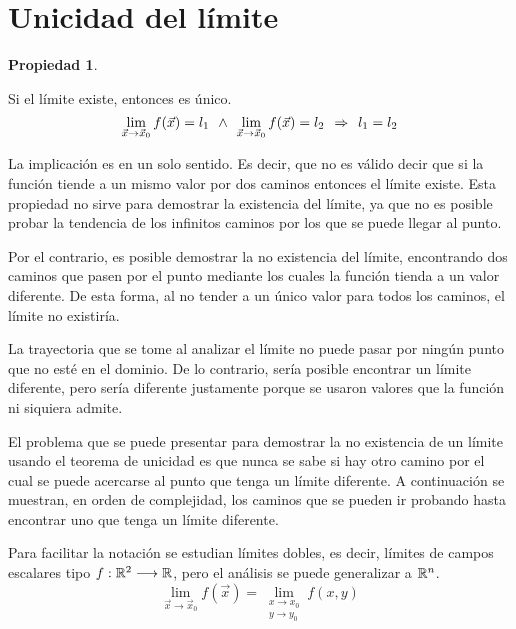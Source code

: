 \documentclass[a5paper,12pt,twoside]{book}
\newtheorem{prop}{{Propiedad}}[chapter]
\begin{document}
\section{Unicidad del límite}

\begin{mdframed}[style=MyFrame1]
    \begin{prop}
    \end{prop}
    Si el límite existe, entonces es único.
    \begin{equation*}
        \lim_{\Vec{x} \to \Vec{x}_0} f(\Vec{x}) = l_1  \hspace{1ex} \land \hspace{1ex} \lim_{\Vec{x} \to \Vec{x}_0} f(\Vec{x}) = l_2 \hspace{1ex} \Rightarrow \hspace{1ex} l_1=l_2
    \end{equation*}
\end{mdframed}

La implicación es en un solo sentido. Es decir, que no es válido decir que si la función tiende a un mismo valor por dos caminos entonces el límite existe. Esta propiedad no sirve para demostrar la existencia del límite, ya que no es posible probar la tendencia de los infinitos caminos por los que se puede llegar al punto.

Por el contrario, es posible demostrar la no existencia del límite, encontrando dos caminos que pasen por el punto mediante los cuales la función tienda a un valor diferente. De esta forma, al no tender a un único valor para todos los caminos, el límite no existiría.

La trayectoria que se tome al analizar el límite no puede pasar por ningún punto que no esté en el dominio. De lo contrario, sería posible encontrar un límite diferente, pero sería diferente justamente porque se usaron valores que la función ni siquiera admite.

El problema que se puede presentar para demostrar la no existencia de un límite usando el teorema de unicidad es que nunca se sabe si hay otro camino por el cual se puede acercarse al punto que tenga un límite diferente. A continuación se muestran, en orden de complejidad, los caminos que se pueden ir probando hasta encontrar uno que tenga un límite diferente.

Para facilitar la notación se estudian límites dobles, es decir, límites de campos escalares tipo $f:\mathbb{R}^2 \longrightarrow \mathbb{R}$, pero el análisis se puede generalizar a $\mathbb{R}^n$.
\begin{equation*}
    \lim_{\Vec{x} \to \Vec{x}_0} f(\Vec{x}) = \lim_{\substack{x \to x_0\\y \to y_0}} f(x,y)
\end{equation*}
\end{document}
